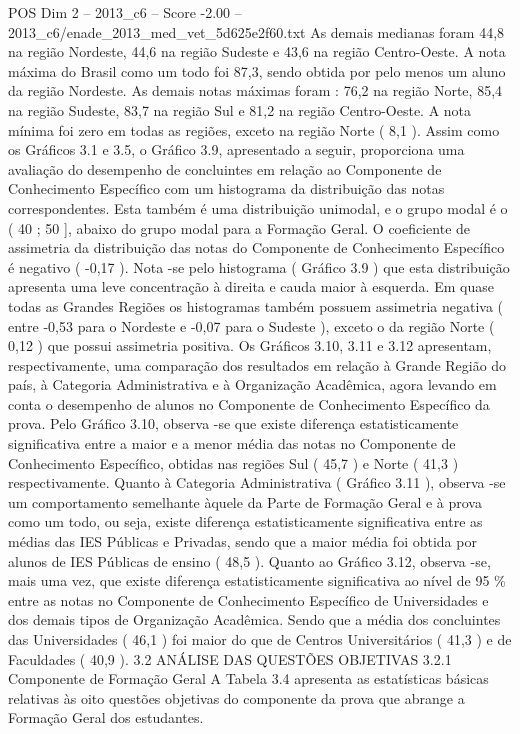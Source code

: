 \begin{textsample}{POS Dim 2 – 2013\_c6 – Score -2.00 – 2013\_c6/enade\_2013\_med\_vet\_5d625e2f60.txt}
As demais medianas foram 44,8 na região Nordeste, 44,6 na região Sudeste e 43,6 na região Centro-Oeste.
A nota máxima do Brasil como um todo foi 87,3, sendo obtida por pelo menos um aluno da região Nordeste.
As demais notas máximas foram : 76,2 na região Norte, 85,4 na região Sudeste, 83,7 na região Sul e 81,2 na região Centro-Oeste.
A nota mínima foi zero em todas as regiões, exceto na região Norte ( 8,1 ).
Assim como os Gráficos 3.1 e 3.5, o Gráfico 3.9, apresentado a seguir, proporciona uma avaliação do desempenho de concluintes em relação ao Componente de Conhecimento Específico com um histograma da distribuição das notas correspondentes.
Esta também é uma distribuição unimodal, e o grupo modal é o ( 40 ; 50 ], abaixo do grupo modal para a Formação Geral.
O coeficiente de assimetria da distribuição das notas do Componente de Conhecimento Específico é negativo ( -0,17 ).
Nota -se pelo histograma ( Gráfico 3.9 ) que esta distribuição apresenta uma leve concentração à direita e cauda maior à esquerda.
Em quase todas as Grandes Regiões os histogramas também possuem assimetria negativa ( entre -0,53 para o Nordeste e -0,07 para o Sudeste ), exceto o da região Norte ( 0,12 ) que possui assimetria positiva.
Os Gráficos 3.10, 3.11 e 3.12 apresentam, respectivamente, uma comparação dos resultados em relação à Grande Região do país, à Categoria Administrativa e à Organização Acadêmica, agora levando em conta o desempenho de alunos no Componente de Conhecimento Específico da prova.
Pelo Gráfico 3.10, observa -se que existe diferença estatisticamente significativa entre a maior e a menor média das notas no Componente de Conhecimento Específico, obtidas nas regiões Sul ( 45,7 ) e Norte ( 41,3 ) respectivamente.
Quanto à Categoria Administrativa ( Gráfico 3.11 ), observa -se um comportamento semelhante àquele da Parte de Formação Geral e à prova como um todo, ou seja, existe diferença estatisticamente significativa entre as médias das IES Públicas e Privadas, sendo que a maior média foi obtida por alunos de IES Públicas de ensino ( 48,5 ).
Quanto ao Gráfico 3.12, observa -se, mais uma vez, que existe diferença estatisticamente significativa ao nível de 95 \% entre as notas no Componente de Conhecimento Específico de Universidades e dos demais tipos de Organização Acadêmica.
Sendo que a média dos concluintes das Universidades ( 46,1 ) foi maior do que de Centros Universitários ( 41,3 ) e de Faculdades ( 40,9 ). 3.2 ANÁLISE DAS QUESTÕES OBJETIVAS 3.2.1 Componente de Formação Geral A Tabela 3.4 apresenta as estatísticas básicas relativas às oito questões objetivas do componente da prova que abrange a Formação Geral dos estudantes.

\end{textsample}
